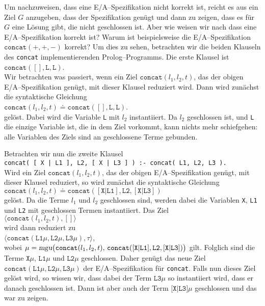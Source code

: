 Um nachzuweisen, dass eine E/A--Spezifikation nicht korrekt ist, reicht es aus
ein Ziel $G$ anzugeben, dass der Spezifikation gen\"{u}gt und dann zu zeigen,
dass es f\"{u}r $G$ eine L\"{o}sung gibt, die nicht geschlossen ist.
Aber wie weisen wir nach dass eine E/A--Spezifikation korrekt ist?
Warum ist beispielsweise die E/A--Spezifikation $\mathtt{concat}(+,+,-)$
korrekt?  Um dies zu sehen, betrachten wir die beiden Klauseln des \texttt{concat}
implementierenden Prolog--Programms.  Die erste Klausel ist \\[0.1cm]
\hspace*{1.3cm} $\mathtt{concat}(\mathtt{[]}, \mathtt{L}, \mathtt{L})$. \\[0.1cm]
Wir betrachten was passiert, wenn ein Ziel $\mathtt{concat}(l_1,l_2,t)$, das der obigen
E/A--Spezifikation gen\"{u}gt, mit dieser Klausel reduziert wird.  Dann wird zun\"{a}chst die
syntaktische Gleichung \\[0.1cm]
\hspace*{1.3cm} $\mathtt{concat}(l_1,l_2,t) \doteq \mathtt{concat}(\mathtt{[]}, \mathtt{L}, \mathtt{L})$. \\[0.1cm]
gel\"{o}st.  Dabei wird  die Variable \texttt{L} mit $l_2$ instantiiert. Da $l_2$ geschlossen
ist, und \texttt{L} die einzige Variable ist, die in dem Ziel vorkommt, kann nichts mehr
schiefgehen: alle Variablen des Ziels sind an geschlossene Terme gebunden.

Betrachten wir nun die zweite Klausel \\[0.1cm]
\hspace*{1.3cm} {\tt concat( [ X | L1 ], L2, [ X | L3 ] ) :- concat( L1, L2, L3 ).} \\[0.1cm]
Wird ein Ziel  $\mathtt{concat}(l_1,l_2,t)$, das der obigen
E/A--Spezifikation gen\"{u}gt, mit dieser Klausel reduziert, so wird zun\"{a}chst die syntaktische
Gleichung \\[0.1cm]
\hspace*{1.3cm} $\mathtt{concat}(l_1,l_2,t) \doteq \mathtt{concat( [ X | L1 ], L2, [ X | L3 ] )}$ \\[0.1cm]
gel\"{o}st.  Da die Terme $l_1$ und $l_2$ geschlossen sind, werden dabei die Variablen 
\texttt{X}, \texttt{L1} und \texttt{L2} mit geschlossen Termen instantiiert.  Das Ziel \\[0.1cm]
\hspace*{1.3cm} $\langle \mathtt{concat}(l_1,l_2,t), [] \rangle$ \\[0.1cm]
wird dann reduziert zu \\[0.1cm]
\hspace*{1.3cm} $\langle \mathtt{concat( L1\mu, L2\mu, L3\mu )}, \tau \rangle$, \\[0.1cm]
wobei $\mu = \textsl{mgu}\big(\mathtt{concat}(l_1,l_2,t),\,\mathtt{concat( [ X | L1 ], L2, [ X | L3 ] )}\big)$ 
gilt.  Folglich sind die Terme $\mathtt{X}\mu$, $\mathtt{L1}\mu$ und $\texttt{L2}\mu$ geschlossen.  Daher 
gen\"{u}gt das neue Ziel $\mathtt{concat( L1\mu, L2\mu, L3\mu )}$ der E/A--Spezifikation f\"{u}r \texttt{concat}.
Falls nun dieses Ziel gel\"{o}st wird, so wissen wir, dass 
dabei der Term $\texttt{L3}\mu$ so instantiiert wird, dass er danach geschlossen ist.  
Dann ist aber auch der Term $\texttt{[X|L3]}\mu$ geschlossen
und das war zu zeigen.


